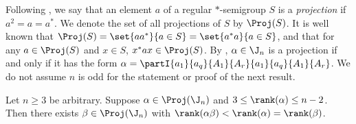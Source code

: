 Following \cite{NS1978}, we say that an element $a$ of a regular $*$-semigroup $S$ is a \emph{projection} if $a^2=a=a^*$.  We denote the set of all projections of $S$ by $\Proj(S)$.  It is well known that ${\Proj(S)=\set{aa^*}{a\in S}=\set{a^*a}{a\in S}}$, and that for any $a\in \Proj(S)$ and $x\in S$, $x^*ax\in \Proj(S)$.
%
By \cite[Lemma 4]{EF2012}, $\alpha\in\J_n$ is a projection if and only if it has the form $\alpha=\partI{a_1}{a_q}{A_1}{A_r}{a_1}{a_q}{A_1}{A_r}$.  
%
We do not assume $n$ is odd for the statement or proof of the next result.




\begin{lemma}\label{lem:proj1_Jn}
Let $n\geq3$ be arbitrary.  Suppose $\alpha\in \Proj(\J_n)$ and $3\leq \rank(\alpha)\leq n-2$.  Then there exists $\beta\in \Proj(\J_n)$ with  $\rank(\alpha\beta)<\rank(\alpha)=\rank(\beta)$.
\end{lemma}

